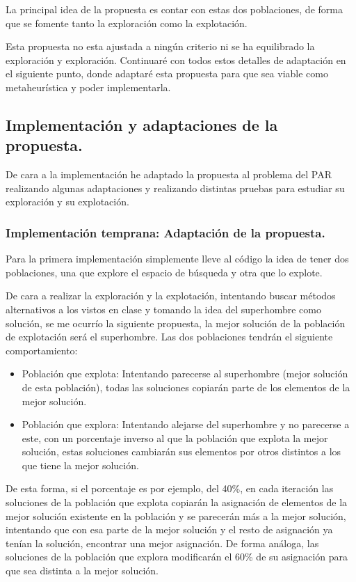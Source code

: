 \documentclass[12pt, spanish]{article}
\begin{document}
La principal idea de la propuesta es contar con estas dos poblaciones, de forma que se fomente tanto la exploración como la explotación.

Esta propuesta no esta ajustada a ningún criterio ni se ha equilibrado la exploración y exploración. Continuaré con todos estos detalles de adaptación en el siguiente punto, donde adaptaré esta propuesta para que sea viable como metaheurística y poder implementarla.
 

\subsection{Implementación y adaptaciones de la propuesta.}

De cara a la implementación he adaptado la propuesta al problema del PAR realizando algunas adaptaciones y realizando distintas pruebas para estudiar su exploración y su explotación.

\subsubsection{Implementación temprana: Adaptación de la propuesta.}

Para la primera implementación simplemente lleve al código la idea de tener dos poblaciones, una que explore el espacio de búsqueda y otra que lo explote.

De cara a realizar la exploración y la explotación, intentando buscar métodos alternativos a los vistos en clase y tomando la idea del superhombre como solución, se me ocurrío la siguiente propuesta, la mejor solución de la población de explotación será el superhombre. Las dos poblaciones tendrán el siguiente comportamiento:

\begin{itemize}
	\item Población que explota: Intentando parecerse al superhombre (mejor solución de esta población), todas las soluciones copiarán parte de los elementos de la mejor solución.
	\item Población que explora: Intentando alejarse del superhombre y no parecerse a este, con un porcentaje inverso al que la población que explota la mejor solución, estas soluciones cambiarán sus elementos por otros distintos a los que tiene la mejor solución.
\end{itemize} 

De esta forma, si el porcentaje es por ejemplo, del 40\%, en cada iteración las soluciones de la población que explota copiarán la asignación de elementos de la mejor solución existente en la población y se parecerán más a la mejor solución, intentando que con esa parte de la mejor solución y el resto de asignación ya tenían la solución, encontrar una mejor asignación. De forma análoga, las soluciones de la población que explora modificarán el 60\% de su asignación para que sea distinta a la mejor solución.
\end{document}
